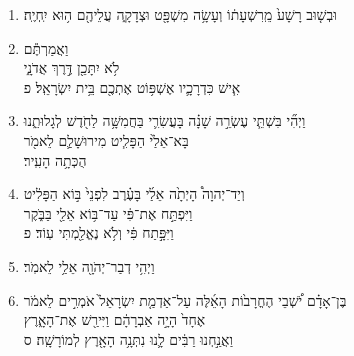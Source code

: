 \documentclass[12pt,a4paper,titlepage]{article}
\def \pslabelsep{-0.9em} %
\def \psleftmargin{0em} %
\begin{document}
\begin{enumerate}[leftmargin=\psleftmargin, labelsep = \pslabelsep, label={\arabic*}, font=\color{\pscolor}\small\textsuperscript, parsep=0em, itemsep=0em, topsep=0em ]
\item \texthebrew{וּבְשׁ֤וּב רָשָׁע֙ מֵֽרִשְׁעָת֔וֹ וְעָשָׂ֥ה מִשְׁפָּ֖ט וּצְדָקָ֑ה עֲלֵיהֶ֖ם ה֥וּא יִֽחְיֶֽה׃}
\item \texthebrew{וַאֲמַרְתֶּ֕ם \\ לֹ֥א יִתָּכֵ֖ן דֶּ֣רֶךְ אֲדֹנָ֑י \\ אִ֧ישׁ כִּדְרָכָ֛יו אֶשְׁפּ֥וֹט אֶתְכֶ֖ם בֵּ֥ית יִשְׂרָאֵֽל׃ פ}\parSpace
\item \texthebrew{וַיְהִ֞י בִּשְׁתֵּ֧י עֶשְׂרֵ֣ה שָׁנָ֗ה בָּעֲשִׂרִ֛י בַּחֲמִשָּׁ֥ה לַחֹ֖דֶשׁ לְגָלוּתֵ֑נוּ \\ בָּא־אֵלַ֙י הַפָּלִ֧יט מִירוּשָׁלִַ֛ם לֵאמֹ֖ר \\ הֻכְּתָ֥ה הָעִֽיר׃}
\item \texthebrew{וְיַד־יְהוָה֩ הָיְתָ֙ה אֵלַ֜י בָּעֶ֗רֶב לִפְנֵי֙ בּ֣וֹא הַפָּלִ֔יט \\ וַיִּפְתַּ֣ח אֶת־פִּ֔י עַד־בּ֥וֹא אֵלַ֖י בַּבֹּ֑קֶר \\ וַיִּפָּ֣תַח פִּ֔י וְלֹ֥א נֶאֱלַ֖מְתִּי עֽוֹד׃ פ}\verseSpace
\item \texthebrew{וַיְהִ֥י דְבַר־יְהֹוָ֖ה אֵלַ֥י לֵאמֹֽר׃}
\item \texthebrew{בֶּן־אָדָ֗ם יֹ֠שְׁבֵי הֶחֳרָב֙וֹת הָאֵ֜לֶּה עַל־אַדְמַ֤ת יִשְׂרָאֵל֙ אֹמְרִ֣ים לֵאמֹ֔ר \\ אֶחָד֙ הָיָ֣ה אַבְרָהָ֔ם וַיִּירַ֖שׁ אֶת־הָאָ֑רֶץ \\ וַאֲנַ֣חְנוּ רַבִּ֔ים לָ֛נוּ נִתְּנָ֥ה הָאָ֖רֶץ לְמוֹרָשָֽׁה׃ ס}\verseSpace


\end{enumerate}
\end{document}
